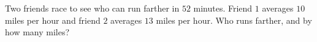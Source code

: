 Two friends race to see who can run farther in $52$ minutes. Friend $1$ averages $10$ miles per hour and friend $2$ averages $13$ miles per hour. Who runs farther, and by how many miles?
